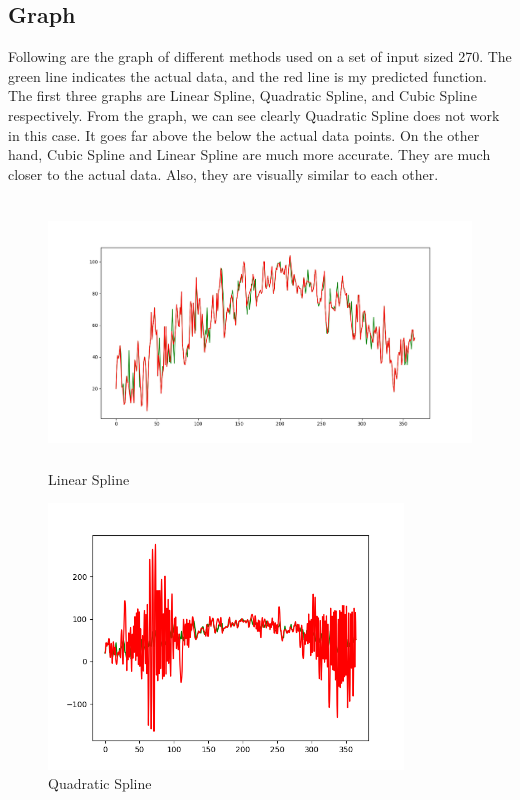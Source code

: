 \documentclass{article}
\begin{document}
\subsection{Graph}
Following are the graph of different methods used on a set of input sized 270. The green line indicates the actual data, and the red line is my predicted function.\\
The first three graphs are Linear Spline, Quadratic Spline, and Cubic Spline respectively. From the graph, we can see clearly Quadratic Spline does not work in this case. It goes far above the below the actual data points. On the other hand, Cubic Spline and Linear Spline are much more accurate. They are much closer to the actual data. Also, they are visually similar to each other.\\
\begin{figure}[H]
    \centering
    \includegraphics[height=200pt]{linear_spline_270.png}    
    \caption{Linear Spline}
    \label{linear spline}
\end{figure}
\begin{figure}[H]
    \centering
    \includegraphics[height=200pt]{quadratic_spline_270.png}    
    \caption{Quadratic Spline}
    \label{quadratic spline}
\end{figure}
\end{document}
